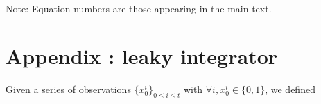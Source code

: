 \documentclass[10pt,letterpaper]{article}
\newcommand{\ms}{\si{\milli\second}}%
\newcommand{\seeFig}[1]{Figure~\ref{fig:#1}}
\newcommand{\seeApp}[1]{Appendix~\ref{app:#1}}
\begin{document}
%
%
%
%
%

Note: Equation numbers are those appearing in the main text.
\section{Appendix : leaky integrator}
\label{app:leaky}
Given a series of observations $\{x_0^i\}_{0\leq i \leq t}$
with $\forall i, x_0^i \in \{0, 1 \}$, we defined
\end{document}
